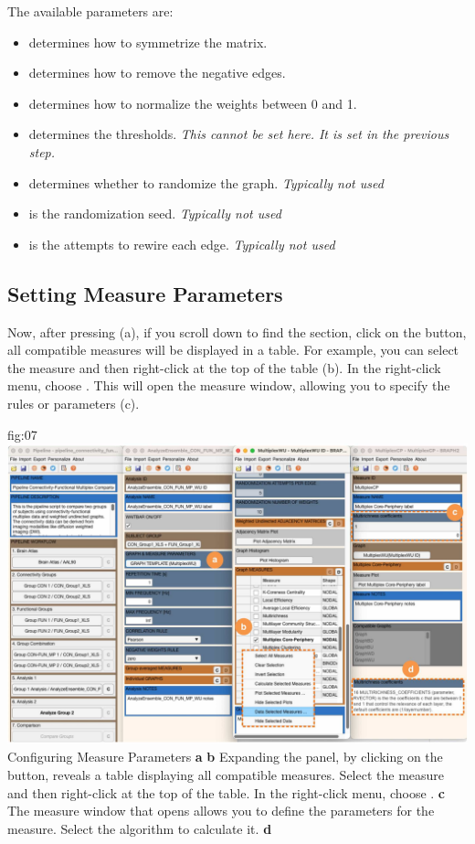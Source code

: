 \documentclass[justified]{tufte-handout}
\begin{document}
The available parameters are:
\begin{itemize}
	\item {} determines how to symmetrize the matrix.
	\item {} determines how to remove the negative edges.
	\item {} determines how to normalize the weights between 0 and 1.
	\item {} determines the thresholds. \emph{This cannot be set here. It is set in the previous step.}
	\item {} determines whether to randomize the graph. \emph{Typically not used}
	\item {} is the randomization seed. \emph{Typically not used}
	\item {} is the attempts to rewire each edge. \emph{Typically not used}
\end{itemize}

\subsection{Setting Measure Parameters}

Now, after pressing  (a), if you scroll down to find the  section, click on the  button, all compatible measures will be displayed in a table. 
For example, you can select the  measure and then right-click at the top of the table (b). In the right-click menu, choose . 
This will open the measure window, allowing you to specify the rules or parameters (c).

	{fig:07}
	{
	\includegraphics{fig07.jpg}
	}
	{Configuring Measure Parameters}
	{
        {\bf a}
	{\bf b} Expanding the  panel, by clicking on the  button, reveals a table displaying all compatible measures. 
	Select the  measure and then right-click at the top of the table. In the right-click menu, choose .
	{\bf c} The measure window that opens allows you to define the parameters for the  measure. Select the  algorithm to calculate it.
    {\bf d}
	}
\end{document}
